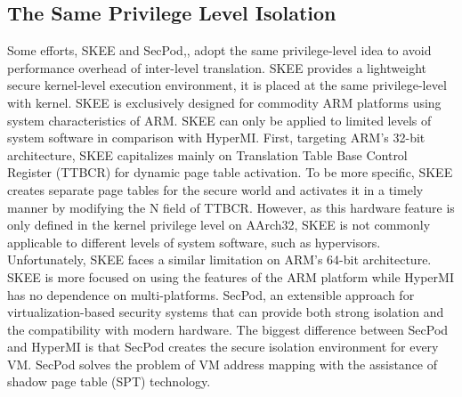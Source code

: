 \documentclass[conference]{IEEEtran}
\begin{document}
\subsection{The Same Privilege Level Isolation}
Some efforts, 
 SKEE\cite{Azab2016SKEE} and SecPod\cite{Wang2015SecPod},\cite{Deng2017Dancing}, adopt the same privilege-level idea to avoid performance overhead of inter-level translation.
 SKEE provides a lightweight secure kernel-level execution environment, it is placed at the same privilege-level with kernel. SKEE is exclusively designed for commodity ARM platforms using system characteristics of ARM. 
SKEE can only be applied to limited levels of system software in comparison with HyperMI. First, targeting ARM's 32-bit architecture, SKEE capitalizes mainly on Translation Table Base Control Register (TTBCR) for dynamic page table activation. To be more specific, SKEE creates separate page tables for the secure world and activates it in a timely manner by modifying the N field of TTBCR. However, as this hardware feature is only defined in the kernel privilege level on AArch32, SKEE is not commonly applicable to different levels of system software, such as hypervisors. Unfortunately, SKEE faces a similar limitation on ARM's 64-bit architecture. SKEE is more focused on using the features of the ARM platform while HyperMI has no dependence on multi-platforms.
SecPod, an extensible approach for virtualization-based security systems that can provide both strong isolation and the compatibility with modern hardware. The biggest difference between SecPod and HyperMI is that SecPod creates the secure isolation environment for every VM. SecPod solves the problem of VM address mapping with the assistance of shadow page table (SPT) technology.
\end{document}
